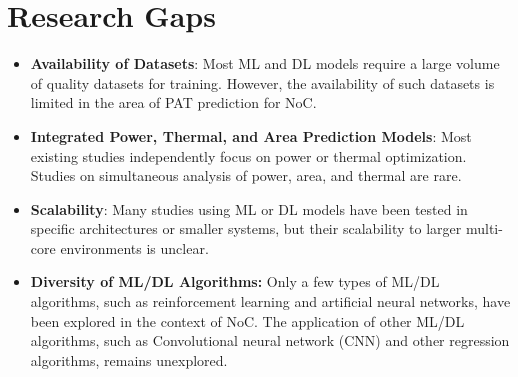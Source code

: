 \documentclass[conference]{IEEEtran}
\begin{document}
\clearpage %

\section{Research Gaps}
\begin{itemize}
    \item \textbf{Availability of Datasets}: Most ML and DL models require a large volume of quality datasets for training. However, the availability of such datasets is limited in the area of PAT prediction for NoC.
  
    \item \textbf{Integrated Power, Thermal, and Area Prediction Models}: Most existing studies independently focus on power or thermal optimization. Studies on simultaneous analysis of power, area, and thermal are rare.
  
    \item \textbf{Scalability}: Many studies using ML or DL models have been tested in specific architectures or smaller systems, but their scalability to larger multi-core environments is unclear.

    \item \textbf{Diversity of ML/DL Algorithms:} Only a few types of ML/DL algorithms, such as reinforcement learning and artificial neural networks, have been explored in the context of NoC. The application of other ML/DL algorithms, such as Convolutional neural network (CNN) and other regression algorithms, remains unexplored.
\end{itemize}
\end{document}
